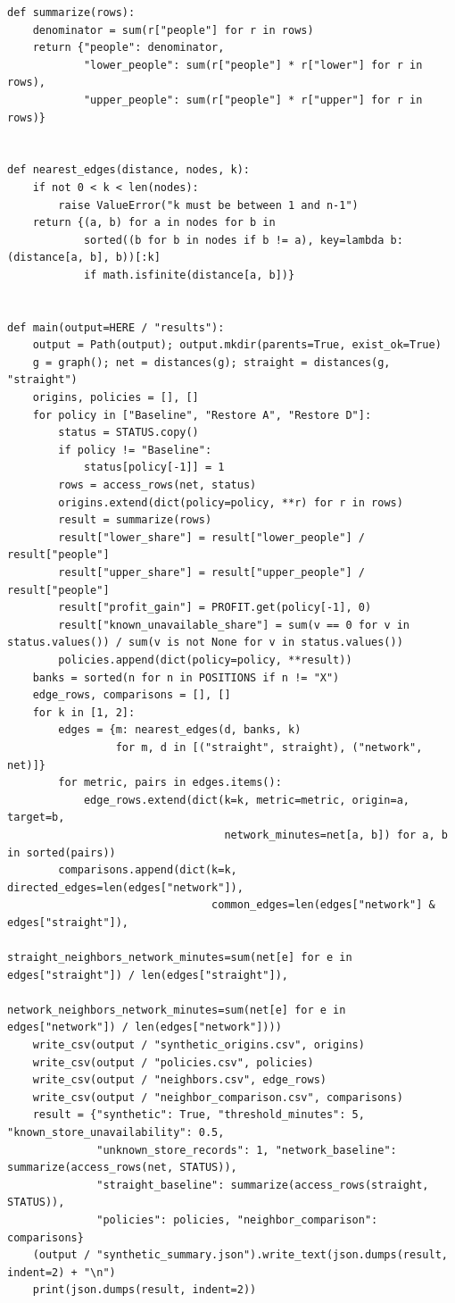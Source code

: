 \begin{Verbatim}[breaklines,breakanywhere,fontsize=\small]
def summarize(rows):
    denominator = sum(r["people"] for r in rows)
    return {"people": denominator,
            "lower_people": sum(r["people"] * r["lower"] for r in rows),
            "upper_people": sum(r["people"] * r["upper"] for r in rows)}


def nearest_edges(distance, nodes, k):
    if not 0 < k < len(nodes):
        raise ValueError("k must be between 1 and n-1")
    return {(a, b) for a in nodes for b in
            sorted((b for b in nodes if b != a), key=lambda b: (distance[a, b], b))[:k]
            if math.isfinite(distance[a, b])}


def main(output=HERE / "results"):
    output = Path(output); output.mkdir(parents=True, exist_ok=True)
    g = graph(); net = distances(g); straight = distances(g, "straight")
    origins, policies = [], []
    for policy in ["Baseline", "Restore A", "Restore D"]:
        status = STATUS.copy()
        if policy != "Baseline":
            status[policy[-1]] = 1
        rows = access_rows(net, status)
        origins.extend(dict(policy=policy, **r) for r in rows)
        result = summarize(rows)
        result["lower_share"] = result["lower_people"] / result["people"]
        result["upper_share"] = result["upper_people"] / result["people"]
        result["profit_gain"] = PROFIT.get(policy[-1], 0)
        result["known_unavailable_share"] = sum(v == 0 for v in status.values()) / sum(v is not None for v in status.values())
        policies.append(dict(policy=policy, **result))
    banks = sorted(n for n in POSITIONS if n != "X")
    edge_rows, comparisons = [], []
    for k in [1, 2]:
        edges = {m: nearest_edges(d, banks, k)
                 for m, d in [("straight", straight), ("network", net)]}
        for metric, pairs in edges.items():
            edge_rows.extend(dict(k=k, metric=metric, origin=a, target=b,
                                  network_minutes=net[a, b]) for a, b in sorted(pairs))
        comparisons.append(dict(k=k, directed_edges=len(edges["network"]),
                                common_edges=len(edges["network"] & edges["straight"]),
                                straight_neighbors_network_minutes=sum(net[e] for e in edges["straight"]) / len(edges["straight"]),
                                network_neighbors_network_minutes=sum(net[e] for e in edges["network"]) / len(edges["network"])))
    write_csv(output / "synthetic_origins.csv", origins)
    write_csv(output / "policies.csv", policies)
    write_csv(output / "neighbors.csv", edge_rows)
    write_csv(output / "neighbor_comparison.csv", comparisons)
    result = {"synthetic": True, "threshold_minutes": 5, "known_store_unavailability": 0.5,
              "unknown_store_records": 1, "network_baseline": summarize(access_rows(net, STATUS)),
              "straight_baseline": summarize(access_rows(straight, STATUS)),
              "policies": policies, "neighbor_comparison": comparisons}
    (output / "synthetic_summary.json").write_text(json.dumps(result, indent=2) + "\n")
    print(json.dumps(result, indent=2))



\end{Verbatim}
